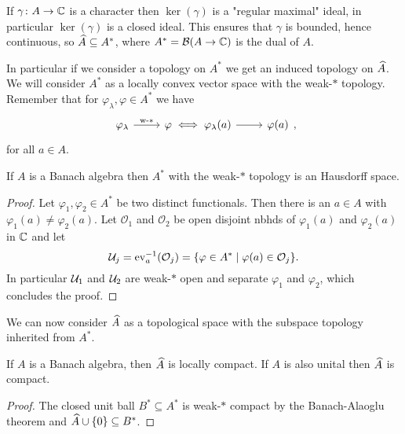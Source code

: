 \begin{fact}
 If $\gamma\colon A\to\mathbb{C}$ is a character then $\ker(\gamma)$ is a "regular maximal" ideal, in particular $\ker(\gamma)$ is a closed ideal. This ensures that $\gamma$ is bounded, hence continuous, so $\widehat{A}\subseteq A^\ast$, where $A^\ast=\mathcal{B}(A\to\mathbb{C})$ is the dual of $A$.
 
 \noindent In particular if we consider a topology on $A^\ast$ we get an induced topology on $\widehat{A}$. We will consider $A^\ast$ as a locally convex vector space with the weak-$\ast$ topology. Remember that for $\varphi_\lambda,\varphi\in A^\ast$ we have $$\begin{tikzcd}\varphi_\lambda\arrow["\text{w-}\ast",r] & \varphi\iff\varphi_\lambda(a)\arrow[r] &\varphi(a)\end{tikzcd},$$ for all $a\in A$.
\end{fact}

\begin{lemma}
 If $A$ is a Banach algebra then $A^\ast$ with the weak-$\ast$ topology is an Hausdorff space.
\end{lemma}
\begin{proof}
 Let $\varphi_1,\varphi_2\in A^\ast$ be two distinct functionals. Then there is an $a\in A$ with $\varphi_1(a)\neq\varphi_2(a)$. Let $\mathcal O_1$ and $\mathcal O_2$ be open disjoint nbhds of $\varphi_1(a)$ and $\varphi_2(a)$ in $\mathbb{C}$ and let $$\mathcal{U}_j=\mathrm{ev}_a^{-1}(\mathcal O_j)=\{\varphi\in A^\ast\mid\varphi(a)\in\mathcal O_j\}.$$
 In particular $\mathcal{U}_1$ and $\mathcal{U}_2$ are weak-$\ast$ open and separate $\varphi_1$ and $\varphi_2$, which concludes the proof.
\end{proof}

\noindent We can now consider $\widehat{A}$ as a topological space with the subspace topology inherited from $A^\ast$.

\begin{proposition}
 If $A$ is a Banach algebra, then $\widehat{A}$ is locally compact. If $A$ is also unital then $\widehat{A}$ is compact.
\end{proposition}
\begin{proof}
 The closed unit ball $B^\ast\subseteq A^\ast$ is weak-$\ast$ compact by the Banach-Alaoglu theorem and $\widehat{A}\cup\{0\}\subseteq B^\ast$.
\end{proof}